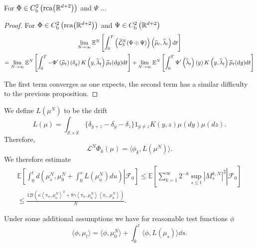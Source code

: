\begin{proposition} 
For $\Phi \in C^2_\mathrm{b}\left(\mathrm{rca}{\left({\mathbb{R}^{d+2}}\right)}\right)$ and $\Psi$ ...

\end{proposition}
\begin{proof}
For $\Phi \in C^2_\mathrm{b}\left(\mathrm{rca}{\left({\mathbb{R}^{d+2}}\right)}\right)$ and $\Psi \in C^2_\mathrm{b}\left(\mathbb{R}^{d+2}\right)$ 
\begin{multline*}
    \lim_{N\rightarrow \infty} \mathbb{E}^N\left[\int_0^T \left(\widetilde{\mathcal{L}}^N_3 (\Phi \oplus \Psi) \right)\left(\widetilde{\mu}_t, \widetilde{\lambda}_t\right)\mathrm{d} t\right]\\
    =
    \lim_{N\rightarrow \infty} \mathbb{E}^N\left[\int_0^T -\Phi^\prime\left(\widetilde{\mu}_t\right)\left(\delta_y\right)K\left(y,\widetilde{\lambda}_t\right)\widetilde{\mu}_t(\mathrm{d} y)\mathrm{d} t\right]
    +\lim_{N\rightarrow \infty} \mathbb{E}^N\left[\int_0^T \Psi^\prime\left(\widetilde{\lambda}_t\right)\left(y\right)K\left(y,\widetilde{\lambda}_t\right)\widetilde{\mu}_t(\mathrm{d} y)\mathrm{d} t\right]
\end{multline*}

The first term converges as one expects, the second term has a similar difficulty to the previous proposition.
\end{proof}


  We define $L(\mu^N)$ to be the drift \begin{equation*}L(\mu)=\int_{\mathbb{X}\times\mathbb{X}} \{\delta_{y+z}-\delta_y-\delta_z\}1_{y\neq z}K(y,z)\mu(dy)\mu(dz). \end{equation*} Therefore, \begin{equation*} \mathcal{L}^N \Phi_k(\mu)=\langle \phi_k, L(\mu^N)\rangle.\end{equation*} We therefore estimate \begin{multline}
    \mathbb{E}\left[\left.\int_0^t d\left(\mu^N_s, \mu^N_0+\int_0^s L(\mu^N_u) du\right)\right|\mathcal{F}_0\right]\leq \mathbb{E}\left[\left.\sum_{k=1}^\infty 2^{-k} \sup_{s\leq t}\left|M^{k, N}_s\right|^2\right| \mathcal{F}_0\right] \\ \leq \frac{12 t \left(\kappa \left<\pi_n, \mu^N_0 \right>^2
                 + 8 \gamma \left<\pi_n, \mu^N_0 \right> \left<\pi_e, \mu^N_0 \right>\right)}{N}.
\end{multline}




Under some additional assumptions we have for reasonable test functions $\phi$
\begin{equation}\label{eq:wk-kinetic}
    \langle \phi, \mu_t\rangle=\langle \phi, \mu^N_0\rangle +\int_0^t \langle \phi, L(\mu_s)\rangle \dd s.
\end{equation} 
